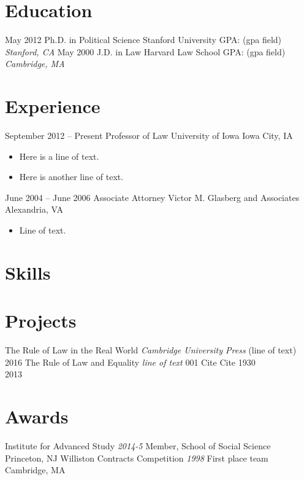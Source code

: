 \documentclass[letterpaper]{moderncv}        %
\begin{document}
\makecvtitle
\section{Education}
\cventry
{May 2012}
{Ph.D. in Political Science}
{Stanford University}
{GPA: (gpa field)}
{\textit{Stanford, CA}}
{}
\cventry
{May 2000}
{J.D. in Law}
{Harvard Law School}
{GPA: (gpa field)}
{\textit{Cambridge, MA}}
{}
\section{Experience}
\cventry
{September 2012 -- Present}
{Professor of Law}
{University of Iowa}
{Iowa City, IA}
{}
{\begin{itemize}%
	\item Here is a line of text.
	\item Here is another line of text.
	\end{itemize}}
\cventry
{June 2004 -- June 2006}
{Associate Attorney}
{Victor M. Glasberg and Associates}
{Alexandria, VA}
{}
{\begin{itemize}%
	\item Line of text.
	\end{itemize}}
\section{Skills}
\section{Projects}
\cventry
{}
{The Rule of Law in the Real World}
{}
{\textit{Cambridge University Press}}
{}
{(line of text)\\2016}
\vspace{1mm}
\cventry
{}
{The Rule of Law and Equality}
{}
{\textit{line of text}}
{}
{001 Cite Cite 1930\\2013}
\vspace{1mm}
\section{Awards}
\cventry
{}
{Institute for Advanced Study}
{}
{\textit{2014-5}}
{}
{Member, School of Social Science\\Princeton, NJ}
\vspace{1mm}
\cventry
{}
{Williston Contracts Competition}
{}
{\textit{1998}}
{}
{First place team\\Cambridge, MA}
\vspace{1mm}
\ 
\end{document}
